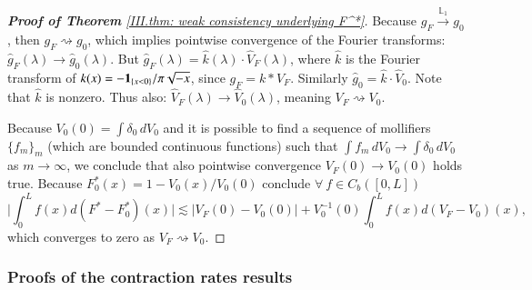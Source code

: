 \begin{proof}[\hypertarget{III.proof weak consistency underlying}{\textbf{Proof of Theorem} \ref{III.thm: weak consistency underlying F^*}}] Because $g_{\scriptscriptstyle{F}} \stackrel{\mathbb{L}_1}{\to} g_0$, then $g_{\scriptscriptstyle{F}} \rightsquigarrow g_0$, which implies pointwise convergence of the Fourier transforms: $\hat{g}_{\scriptscriptstyle{F}} (\lambda) \to \hat{g}_0(\lambda)$. But $\hat{g}_{\scriptscriptstyle{F}} (\lambda) = \hat{k}(\lambda) \cdot \hat{V}_{\scriptscriptstyle{F}}(\lambda) $, where $\hat{k}$ is the Fourier transform of $k(x) =  -\mathbf{1}_{\{x < 0 \}}/ \pi \sqrt{-x}$, since $g_{\scriptscriptstyle{F}} = k * V_{\scriptscriptstyle{F}} $. Similarly $\hat{g}_0 = \hat{k} \cdot \hat{V}_0$. Note that $\hat{k}$ is nonzero. Thus also: $\hat{V}_{\scriptscriptstyle{F}}(\lambda) \to \hat{V}_0(\lambda)$, meaning $V_{\scriptscriptstyle{F}} \rightsquigarrow V_0$. 

Because $V_0(0) = \int \delta_0 \, dV_0$ and it is possible to find a sequence of mollifiers $\{f_m\}_m$ (which are bounded continuous functions) such that $\int f_m \, dV_0 \to \int \delta_0 \, dV_0$ as $m \to \infty$, we conclude that also pointwise convergence $V_{\scriptscriptstyle{F}}(0) \to V_0(0)$ holds true. Because $F^*_0(x) = 1 - V_0(x)/V_0(0)$ conclude $\forall \: f \in C_b([0,L])$
$$  \bigg| \int_0^L f(x)   d(F^* - F^*_0) (x) \bigg| \lesssim |V_{\scriptscriptstyle{F}}(0) - V_0(0)| + V^{-1}_0(0) \int_0^L f(x)   d(V_{\scriptscriptstyle{F}} - V_0) (x),$$
which converges to zero as $V_{\scriptscriptstyle{F}} \rightsquigarrow V_0$.
\end{proof}


\subsubsection{Proofs of the contraction rates results}\label{III.sec: proof contraction rates}

